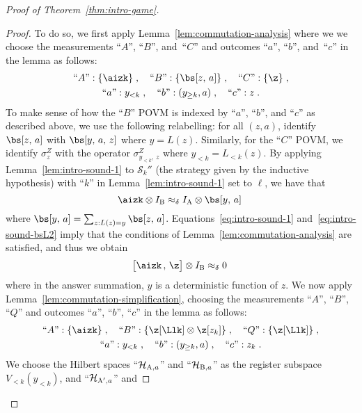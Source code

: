 \documentclass[11pt]{article}
\theoremstyle{definition}
\newcommand{\Id}{\ensuremath{I}}
\newcommand{\mH}{\ensuremath{\mathcal{H}}}
\newcommand{\ia}{\Id_\alice}
\newcommand{\ib}{\Id_\bob}
\newcommand{\strategy}{\mathscr{S}}
\newcommand{\labelstyle}[1]{\ensuremath{\textsc{#1}}\xspace}
\newcommand{\alice}{\labelstyle{A}}
\newcommand{\bob}{\labelstyle{B}}
\begin{document}
\begin{proof}[Proof of Theorem~\ref{thm:intro-game}]
\begin{proof}
    To do so, we first apply Lemma~\ref{lem:commutation-analysis} where we we
    choose the measurements ``$A$'', ``$B$'', and~``$C$'' and outcomes ``$a$'',
    ``$b$'', and~``$c$'' in the lemma as follows:
    \begin{gather*}
      \text{``$A$''}: \{\aizk\}\;,\quad
      \text{``$B$''}: \{\bs[z, \, a]\}\;,\quad
      \text{``$C$''}: \{\z  \}\;, \\
      \text{``$a$''}: y_{< k} \;, \quad
      \text{``$b$''}: (y_{\geq k},a) \;, \quad
      \text{``$c$''}: z \;.
    \end{gather*}
    To make sense of how the ``$B$'' POVM is indexed by ``$a$'', ``$b$'', and
    ``$c$'' as described above, we use the following relabelling: for all
    $(z,a)$, identify $\bs[z,\, a]$ with $\bs[y,\, a,\, z]$ where $y =
    L(z)$.
    Similarly, for the ``$C$'' POVM, we identify $\sigma^Z_z$ with the operator
    $\sigma^Z_{y_{<k},\, z}$ where $y_{<k} = L_{<k}(z)$.
    By applying Lemma~\ref{lem:intro-sound-1} to $\strategy_k''$ (the strategy
    given by the inductive hypothesis) with ``$k$'' in
    Lemma~\ref{lem:intro-sound-1} set to $\ell$, we have that
    \begin{equation}
      \label{eq:intro-sound-bsL2}
      \aizk \otimes \ib \approx_\delta \ia \otimes \bs[y,\, a]\;
    \end{equation}
    where $\bs[y,\, a] = \sum_{z: L(z) = y} \bs[z,\, a]$.
    Equations~\eqref{eq:intro-sound-1} and~\eqref{eq:intro-sound-bsL2} imply that the
    conditions of Lemma~\ref{lem:commutation-analysis} are satisfied, and thus
    we obtain
    \begin{equation}\label{eq:commute-with-Z}
      \bigl[\aizk \,,\, \z \bigr] \otimes \ib \approx_\delta 0\;
    \end{equation}
    where in the answer summation, $y$ is a deterministic function of $z$.
    We now apply Lemma~\ref{lem:commutation-simplification}, choosing the
    measurements ``$A$'', ``$B$'', ``$Q$'' and outcomes ``$a$'', ``$b$'',
    ``$c$'' in the lemma as follows:
    \begin{gather*}
      \text{``$A$''}: \{\aizk\}\;,\quad
      \text{``$B$''}: \{\z[\Llk] \otimes \z[z_k] \}\;, \quad
      \text{``$Q$''}: \{\z[\Llk] \}\;, \\
      \text{``$a$''}: y_{< k} \;, \quad
      \text{``$b$''}: (y_{\geq k}, a) \;, \quad
      \text{``$c$''}: z_k \;.
    \end{gather*}
    We choose the Hilbert spaces ``$\mH_{\alice,a}$'' and ``$\mH_{\bob,a}$'' as
    the register subspace $ V_{<k}(y_{<k})$, and ``$\mH_{\alice',a}$'' and

\end{proof}
\end{proof}
\end{document}
